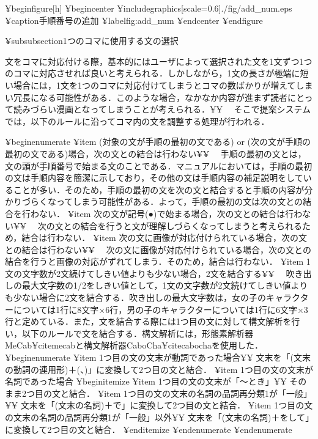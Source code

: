 ¥begin{figure}[h]
 ¥begin{center}
  ¥includegraphics[scale=0.6]{./fig/add\_num.eps}
  ¥caption{手順番号の追加}
  ¥label{fig:add\_num}
 ¥end{center}
¥end{figure}

¥subsubsection{1つのコマに使用する文の選択}

文をコマに対応付ける際，基本的にはユーザによって選択された文を1文ずつ1つのコマに対応させれば良いと考えられる．しかしながら，1文の長さが極端に短い場合には，1文を1つのコマに対応付けてしまうとコマの数ばかりが増えてしまい冗長になる可能性がある．このような場合，なかなか内容が進まず読者にとって読みづらい漫画となってしまうことが考えられる．¥¥
　そこで提案システムでは，以下のルールに沿ってコマ内の文を調整する処理が行われる．

¥begin{enumerate}
¥item (対象の文が手順の最初の文である) or (次の文が手順の最初の文である)場合，次の文との結合は行わない¥¥
　手順の最初の文とは，文の頭が手順番号で始まる文のことである．マニュアルにおいては，手順の最初の文は手順内容を簡潔に示しており，その他の文は手順内容の補足説明をしていることが多い．そのため，手順の最初の文を次の文と結合すると手順の内容が分かりづらくなってしまう可能性がある．よって，手順の最初の文は次の文との結合を行わない．
¥item 次の文が記号(●)で始まる場合，次の文との結合は行わない¥¥
　次の文との結合を行うと文が理解しづらくなってしまうと考えられるため，結合は行わない．
¥item 次の文に画像が対応付けられている場合，次の文との結合は行わない¥¥
　次の文に画像が対応付けられている場合，次の文との結合を行うと画像の対応がずれてしまう．そのため，結合は行わない．
¥item 1文の文字数が2文続けてしきい値よりも少ない場合，2文を結合する¥¥
　吹き出しの最大文字数の1/2をしきい値として，1文の文字数が2文続けてしきい値よりも少ない場合に2文を結合する．吹き出しの最大文字数は，女の子のキャラクターについては1行に8文字×6行，男の子のキャラクターについては1行に6文字×3行と定めている．また，文を結合する際には1つ目の文に対して構文解析を行い，以下のルールで文を結合する．構文解析には，形態素解析器MeCab¥cite{mecab}と構文解析器CaboCha¥cite{cabocha}を使用した．
  ¥begin{enumerate}
  ¥item 1つ目の文の文末が動詞であった場合¥¥
  文末を「(文末の動詞の連用形)＋(、)」に変換して2つ目の文と結合．
  ¥item 1つ目の文の文末が名詞であった場合
    ¥begin{itemize}
    ¥item 1つ目の文の文末が「〜とき」¥¥
    そのまま2つ目の文と結合．
     ¥item 1つ目の文の文末の名詞の品詞再分類1が「一般」¥¥
    文末を「(文末の名詞)＋で」に変換して2つ目の文と結合．
    ¥item 1つ目の文の文末の名詞の品詞再分類1が「一般」以外¥¥
    文末を「(文末の名詞)＋をして」に変換して2つ目の文と結合．
    ¥end{itemize}
  ¥end{enumerate}
¥end{enumerate}


